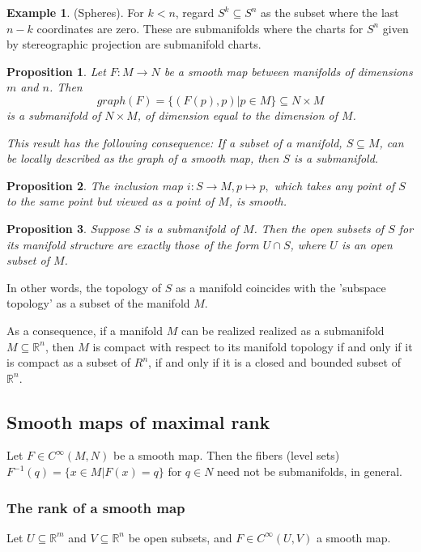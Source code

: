 \documentclass{article}
\newtheorem{proposition}{Proposition}[theorem]
\theoremstyle{definition}
\newtheorem{example}[theorem]{Example}
\begin{document}
\begin{example} (Spheres). For $k < n$, regard $S^k \subseteq S^n$ as the subset where the last $n-k$ coordinates are zero. These are submanifolds where the charts for $S^n$ given by stereographic projection are submanifold charts.

\end{example}

\begin{proposition}
Let $F : M \rightarrow N$ be a smooth map between manifolds of dimensions $m$ and $n$. Then 
\[
    graph(F) = \{(F(p), p) | p \in M \} \subseteq N \times M 
\]
is a submanifold of $N \times M$, of dimension equal to the dimension of $M$.

This result has the following consequence: If a subset of a manifold, $S \subseteq M$, can be locally described as the graph of a smooth map, then $S$ is a submanifold.
\end{proposition}

\begin{proposition}
The inclusion map $i : S \rightarrow M, p \mapsto p,$ which takes any point of $S$ to the same point but viewed as a point of $M$, is smooth.
\end{proposition}

\begin{proposition}
Suppose $S$ is a submanifold of $M$. Then the open subsets of $S$ for its manifold structure are exactly those of the form $U \cap S$, where $U$ is an open subset of $M$.
\end{proposition}

In other words, the topology of $S$ as a manifold coincides with the 'subspace topology' as a subset of the manifold $M$.

As a consequence, if a manifold $M$ can be realized realized as a submanifold $M \subseteq \mathbb R^n$, then $M$ is compact with respect to its manifold topology if and only if it is compact as a subset of $R^n$, if and only if it is a closed and bounded subset of $\mathbb R^n$.

\subsection{Smooth maps of maximal rank}

Let $F \in C^\infty(M,N)$ be a smooth map. Then the fibers (level sets) $F^{-1}(q) = \{x \in M| F(x) = q\}$ for $q \in N$ need not be submanifolds, in general.

\subsubsection{The rank of a smooth map}
Let $U \subseteq \mathbb R^m$ and $V \subseteq \mathbb R^n$ be open subsets, and $F \in  C^\infty(U,V)$ a smooth map.
\end{document}
